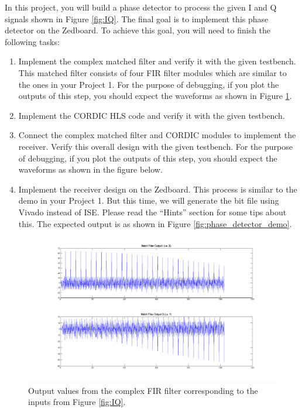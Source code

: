 In this project, you will build a phase detector to process the given I and Q signals shown in Figure \ref{fig:IQ}. The final goal is to implement this phase detector on the Zedboard. To achieve this goal, you will need to finish the following 
tasks:
\begin{enumerate}
\item Implement the complex matched filter and verify it with the given testbench. This matched filter consists of four FIR filter modules which are similar to the ones in your Project 1. For the purpose of debugging, if you plot the outputs of this step, you should expect the waveforms as shown in Figure \ref{fig:XY}.
\item Implement the CORDIC HLS code and verify it with the given testbench.
\item Connect the complex matched filter and CORDIC modules to implement the receiver. Verify this overall design with the given testbench. For the purpose of debugging, if you plot the outputs of this step, you should expect the waveforms as shown in the figure below.
\item Implement the receiver design on the Zedboard. This process is similar to the demo in your Project 1. But this time, we will generate the bit file using Vivado instead of ISE. Please read the ``Hints'' section for some tips about this. The expected output is as shown in Figure \ref{fig:phase_detector_demo}.
\end{enumerate}

\begin{figure}
\centering
%
\includegraphics[width=6in]{images/XY}
\caption{Output values from the complex FIR filter corresponding to the inputs from Figure \ref{fig:IQ}.}
\label{fig:XY}
\end{figure}

